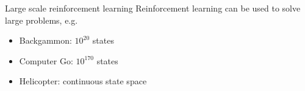 \bgroup
\begin{frame}{Large scale reinforcement learning}
Reinforcement learning can be used to solve large problems, e.g.
\begin{itemize}
\item Backgammon: $10^{20}$ states
\item Computer Go: $10^{170}$ states
\item Helicopter: continuous state space
\end{itemize}
\end{frame}
\egroup